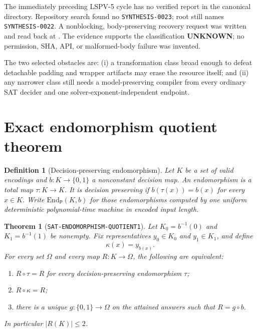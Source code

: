 \documentclass[11pt]{article}
\newtheorem{definition}{Definition}
\newtheorem{theorem}{Theorem}
\begin{document}
The immediately preceding LSPV-5 cycle has no verified report in the
canonical directory.  Repository search found no \texttt{SYNTHESIS-0023};
root  still names \texttt{SYNTHESIS-0022}.  A nonblocking,
body-preserving recovery request was written and read back at
.
The evidence supports the classification \textbf{UNKNOWN}; no permission,
SHA, API, or malformed-body failure was invented.

The two selected obstacles are: (i) a transformation class broad enough to
defeat detachable padding and wrapper artifacts may erase the resource itself;
and (ii) any narrower class still needs a model-preserving compiler from every
ordinary SAT decider and one solver-exponent-independent endpoint.

\section{Exact endomorphism quotient theorem}

\begin{definition}[Decision-preserving endomorphism]
Let $K$ be a set of valid encodings and $b:K\to\{0,1\}$ a nonconstant
decision map.  An endomorphism is a total map $\tau:K\to K$.  It is
decision preserving if $b(\tau(x))=b(x)$ for every $x\in K$.  Write
$\mathrm{End}_{\mathsf P}(K,b)$ for those endomorphisms computed by one
uniform deterministic polynomial-time machine in encoded input length.
\end{definition}

\begin{theorem}[\texttt{SAT-ENDOMORPHISM-QUOTIENT1}]
\label{thm:quot}
Let $K_0=b^{-1}(0)$ and $K_1=b^{-1}(1)$ be nonempty.  Fix representatives
$y_0\in K_0$ and $y_1\in K_1$, and define
\[
 \kappa(x)=y_{b(x)}.                                      \tag{1}
\]
For every set $\Omega$ and every map $R:K\to\Omega$, the following are
equivalent:
\begin{enumerate}[label=(\roman*),leftmargin=1.7em]
\item $R\circ\tau=R$ for every decision-preserving endomorphism $\tau$;
\item $R\circ\kappa=R$;
\item there is a unique $g:\{0,1\}\to\Omega$ on the attained answers such
that $R=g\circ b$.
\end{enumerate}
In particular $|R(K)|\le2$.
\end{theorem}
\end{document}
